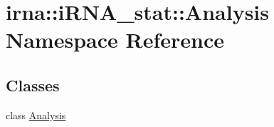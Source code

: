 \hypertarget{namespaceirna_1_1iRNA__stat_1_1Analysis}{
\section{irna\-:\-:i\-R\-N\-A\-\_\-stat\-:\-:\-Analysis \-Namespace \-Reference}
\label{namespaceirna_1_1iRNA__stat_1_1Analysis}
}
\subsection*{\-Classes}
\begin{DoxyCompactItemize}
\item 
class \hyperlink{classirna_1_1iRNA__stat_1_1Analysis_1_1Analysis}{\-Analysis}
\end{DoxyCompactItemize}
